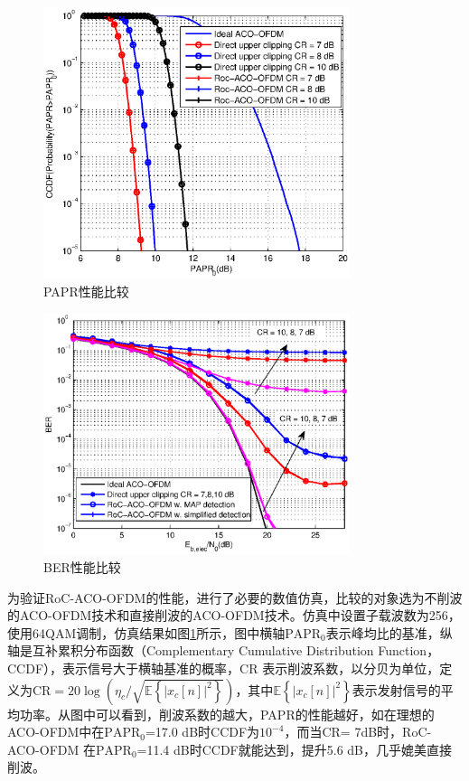 \begin{figure}[htbp]
    \centering
    \includegraphics[width=0.8\textwidth]{figures/chapter-2/CCDF.eps}
    \caption{PAPR性能比较}
    \label{fig:CCDF}
\end{figure}

\begin{figure}[htbp]
    \centering
    \includegraphics[width=0.8\textwidth]{figures/chapter-2/BER_1.eps}
    \caption{BER性能比较}
    \label{fig:BER_1}
\end{figure}
为验证RoC-ACO-OFDM的性能，进行了必要的数值仿真，比较的对象选为不削波的ACO-OFDM技术和直接削波的ACO-OFDM技术。仿真中设置子载波数为256，使用64QAM调制，仿真结果如图\ref{fig:CCDF}所示，图中横轴$\text{PAPR}_0$表示峰均比的基准，纵轴是互补累积分布函数（Complementary Cumulative Distribution Function，CCDF），表示信号大于横轴基准的概率，CR 表示削波系数，以分贝为单位，定义为CR$= 20 \log \left( \eta_c / \sqrt{\mathbb{E} \left\{ |x_c[n]|^2 \right\} } \right)$，其中$\mathbb{E} \left\{ |x_c[n]|^2 \right\}$表示发射信号的平均功率。从图中可以看到，削波系数的越大，PAPR的性能越好，如在理想的ACO-OFDM中在$\text{PAPR}_0$=17.0 dB时CCDF为$10^{-4}$，而当CR= 7dB时，RoC-ACO-OFDM 在$\text{PAPR}_0$=11.4 dB时CCDF就能达到，提升5.6 dB，几乎媲美直接削波。

